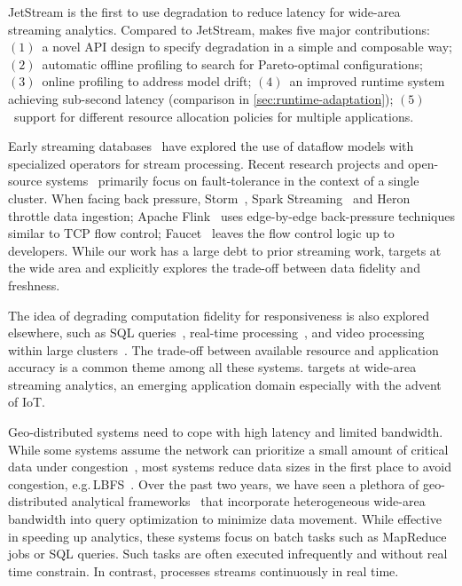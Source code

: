  JetStream is the first to use degradation to reduce latency
for wide-area streaming analytics. Compared to JetStream, \sysname{} makes five
major contributions: $(1)$~a novel API design to specify degradation in a simple
and composable way; $(2)$~automatic offline profiling to search for
Pareto-optimal configurations; $(3)$~online profiling to address model drift;
$(4)$~an improved runtime system achieving sub-second latency (comparison in
\autoref{sec:runtime-adaptation}); $(5)$~support for different resource
allocation policies for multiple applications.

 Early streaming
databases~\cite{abadi2005design, chandrasekaran2003telegraphcq} have explored
the use of dataflow models with specialized operators for stream
processing. Recent research projects and open-source
systems~\cite{akidau2013millwheel, toshniwal2014storm, sanjeev2015twitter,
  zaharia2013discretized, carbone2015apache} primarily focus on fault-tolerance
in the context of a single cluster. When facing back pressure,
Storm~\cite{toshniwal2014storm}, Spark Streaming~\cite{zaharia2013discretized}
and Heron~\cite{sanjeev2015twitter} throttle data ingestion; Apache
Flink~\cite{carbone2015apache} uses edge-by-edge back-pressure techniques
similar to TCP flow control; Faucet~\cite{lattuada2016faucet} leaves the flow
control logic up to developers.  While our work has a large debt to prior
streaming work, \sysname{} targets at the wide area and explicitly explores the
trade-off between data fidelity and freshness.

 The idea of degrading computation fidelity for
responsiveness is also explored elsewhere, such as SQL
queries~\cite{hellerstein1997online, agarwal2013blinkdb,
  ananthanarayanan2014grass}, real-time processing~\cite{farrell2016meantime},
and video processing within large clusters~\cite{zhang2017live}. The trade-off
between available resource and application accuracy is a common theme among all
these systems. \sysname{} targets at wide-area streaming analytics, an emerging
application domain especially with the advent of IoT\@.

 Geo-distributed systems need to cope with high latency
and limited bandwidth. While some systems assume the network can prioritize a
small amount of critical data under congestion~\cite{cho2012surviving}, most
systems reduce data sizes in the first place to avoid congestion,
e.g.\,LBFS~\cite{muthitacharoen2001low}. Over the past two years, we have seen a
plethora of geo-distributed analytical frameworks~\cite{vulimiri2015wananlytics,
  vulimiri2015global, pu2015low, kloudas2015pixida, viswanathan2016clarinet}
that incorporate heterogeneous wide-area bandwidth into query optimization to
minimize data movement. While effective in speeding up analytics, these systems
focus on batch tasks such as MapReduce jobs or SQL queries. Such tasks are often
executed infrequently and without real time constrain. In contrast, \sysname{}
processes streams continuously in real time.

